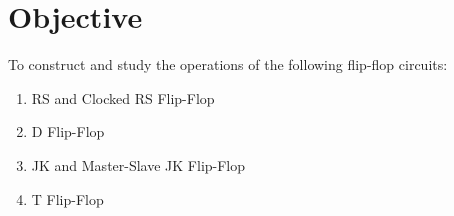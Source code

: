 \section{Objective}

\noindent To construct and study the operations of the following flip-flop circuits:

\begin{enumerate}
    \item RS and Clocked RS Flip-Flop
    \item D Flip-Flop
    \item JK and Master-Slave JK Flip-Flop
    \item T Flip-Flop
\end{enumerate}